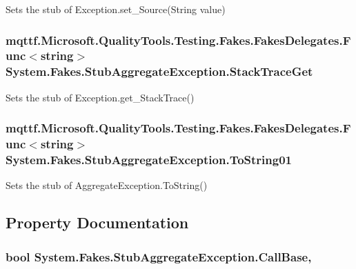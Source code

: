 Sets the stub of Exception.\-set\-\_\-\-Source(\-String value)

\hypertarget{class_system_1_1_fakes_1_1_stub_aggregate_exception_adcc9f9b43ca2bd6e53ce2e7c00601e10}{
\subsubsection[{Stack\-Trace\-Get}]{\setlength{\rightskip}{0pt plus 5cm}mqttf.\-Microsoft.\-Quality\-Tools.\-Testing.\-Fakes.\-Fakes\-Delegates.\-Func$<$string$>$ System.\-Fakes.\-Stub\-Aggregate\-Exception.\-Stack\-Trace\-Get}}\label{class_system_1_1_fakes_1_1_stub_aggregate_exception_adcc9f9b43ca2bd6e53ce2e7c00601e10}


Sets the stub of Exception.\-get\-\_\-\-Stack\-Trace()

\hypertarget{class_system_1_1_fakes_1_1_stub_aggregate_exception_a4d210be0fd671859d5fb3e7ebd8ca190}{
\subsubsection[{To\-String01}]{\setlength{\rightskip}{0pt plus 5cm}mqttf.\-Microsoft.\-Quality\-Tools.\-Testing.\-Fakes.\-Fakes\-Delegates.\-Func$<$string$>$ System.\-Fakes.\-Stub\-Aggregate\-Exception.\-To\-String01}}\label{class_system_1_1_fakes_1_1_stub_aggregate_exception_a4d210be0fd671859d5fb3e7ebd8ca190}


Sets the stub of Aggregate\-Exception.\-To\-String()



\subsection{Property Documentation}
\hypertarget{class_system_1_1_fakes_1_1_stub_aggregate_exception_a7ea88f57b139020d905dec3d6f5c2c1d}{
\subsubsection[{Call\-Base}]{\setlength{\rightskip}{0pt plus 5cm}bool System.\-Fakes.\-Stub\-Aggregate\-Exception.\-Call\-Base\hspace{0.3cm}{\ttfamily [get]}, {\ttfamily [set]}}}\label{class_system_1_1_fakes_1_1_stub_aggregate_exception_a7ea88f57b139020d905dec3d6f5c2c1d}


